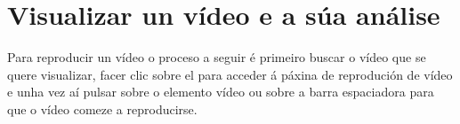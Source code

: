 \documentclass[11pt, a4paper, twoside, titlepage]{book}
\begin{document}
    
    \section{Visualizar un vídeo e a súa análise}
    
    Para reproducir un vídeo o proceso a seguir é primeiro buscar o vídeo que se quere visualizar, 
    facer clic sobre el para acceder á páxina de reprodución de vídeo e unha vez aí pulsar sobre o
    elemento vídeo ou sobre a barra espaciadora para que o vídeo comeze a reproducirse.
    
    


\fancyhead{}
\fancyhead[LE,RO]{\thepage}
\fancyhead[LO]{\rightmark}
\fancyhead[ER]{\leftmark}

\fancyhead{}
\fancyhead[LE,RO]{\thepage}
\fancyhead[LO,ER]{\rightmark}

\end{document}
